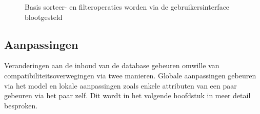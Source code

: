 \begin{figure}[ht]
  \centering
  \hfill%
  \caption{Basis sorteer- en filteroperaties worden via de gebruikersinterface blootgesteld}
  \label{fig:tangfiltersort}
\end{figure}


\subsection{Aanpassingen}
Veranderingen aan de inhoud van de database gebeuren omwille van compatibiliteitsoverwegingen via twee manieren. Globale aanpassingen gebeuren via het model en lokale aanpassingen zoals enkele attributen van een paar gebeuren via het paar zelf. Dit wordt in het volgende hoofdstuk in meer detail besproken.

